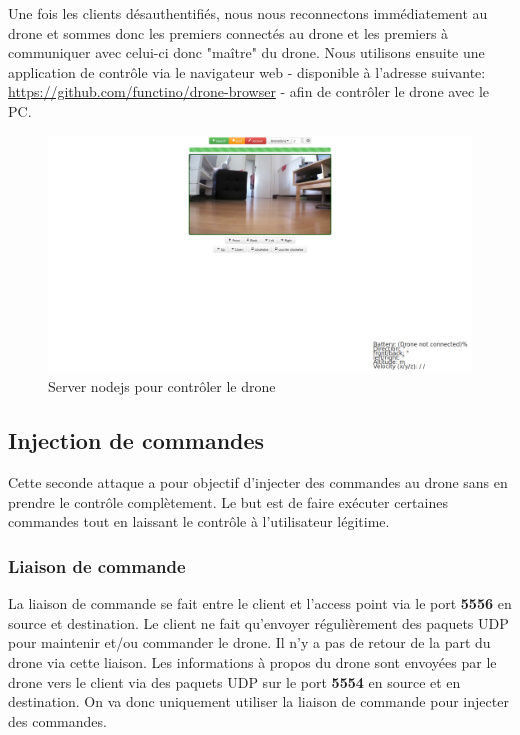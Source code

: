
Une fois les clients désauthentifiés, nous nous reconnectons immédiatement au drone et sommes donc les premiers connectés au drone et les premiers à communiquer avec celui-ci donc "maître" du drone. Nous utilisons ensuite une application de contrôle via le navigateur web - disponible à l'adresse suivante: \url{https://github.com/functino/drone-browser} - afin de contrôler le drone avec le PC.

\begin{figure}[H]
  \centering
  \includegraphics[scale=0.2]{images/drone_browser}
  \caption{Server nodejs pour contrôler le drone}
\end{figure}

\subsection{Injection de commandes}
Cette seconde attaque a pour objectif d'injecter des commandes au drone sans en prendre le contrôle complètement. Le but est de faire exécuter certaines commandes tout en laissant le contrôle à l'utilisateur légitime.

\subsubsection{Liaison de commande}
La liaison de commande se fait entre le client et l'access point via le port \textbf{5556} en source et destination. Le client ne fait qu'envoyer régulièrement des paquets UDP pour maintenir et/ou commander le drone. Il n'y a pas de retour de la part du drone via cette liaison. Les informations à propos du drone sont envoyées par le drone vers le client via des paquets UDP sur le port \textbf{5554} en source et en destination. On va donc uniquement utiliser la liaison de commande pour injecter des commandes.

